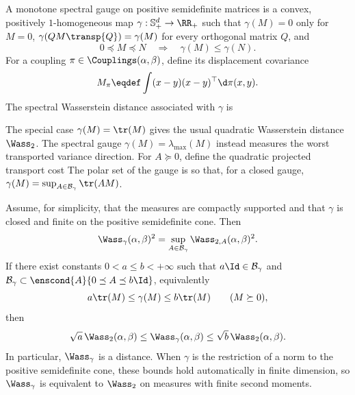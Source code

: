 \begin{defn}\label{def-spectral-wasserstein}
	A monotone spectral gauge on positive semidefinite matrices is a convex, positively $1$-homogeneous map $\gamma:\mathbb S_+^d\to\RR_+$ such that $\gamma(M)=0$ only for $M=0$, $\gamma(QM\transp{Q})=\gamma(M)$ for every orthogonal matrix $Q$, and
	\[
		0\preceq M\preceq N
		\quad\Longrightarrow\quad
		\gamma(M)\leq\gamma(N).
	\]
	For a coupling $\pi\in\Couplings(\alpha,\beta)$, define its displacement covariance
	\[
		M_\pi\eqdef\int (x-y)(x-y)^\top\d\pi(x,y).
	\]
	The spectral Wasserstein distance associated with $\gamma$ is
\end{defn}

The special case $\gamma(M)=\tr(M)$ gives the usual quadratic Wasserstein distance $\Wass_2$. The spectral gauge $\gamma(M)=\lambda_{\max}(M)$ instead measures the worst transported variance direction. For $A\succeq0$, define the quadratic projected transport cost
The polar set of the gauge is
so that, for a closed gauge, $\gamma(M)=\sup_{A\in\mathcal B_\gamma}\tr(AM)$.

\begin{prop}\label{prop-spectral-wasserstein-robust}
	Assume, for simplicity, that the measures are compactly supported and that $\gamma$ is closed and finite on the positive semidefinite cone. Then
	\[
		\Wass_\gamma(\alpha,\beta)^2
		=
		\sup_{A\in\mathcal B_\gamma}
		\Wass_{2,A}(\alpha,\beta)^2.
	\]
	If there exist constants $0<a\leq b<+\infty$ such that $a\Id\in\mathcal B_\gamma$ and $\mathcal B_\gamma\subset\enscond{A}{0\preceq A\preceq b\Id}$, equivalently
	\[
		a\tr(M)\leq\gamma(M)\leq b\tr(M)
		\qquad (M\succeq0),
	\]
	then
	\[
		\sqrt a\,\Wass_2(\alpha,\beta)
		\leq
		\Wass_\gamma(\alpha,\beta)
		\leq
		\sqrt b\,\Wass_2(\alpha,\beta).
	\]
	In particular, $\Wass_\gamma$ is a distance. When $\gamma$ is the restriction of a norm to the positive semidefinite cone, these bounds hold automatically in finite dimension, so $\Wass_\gamma$ is equivalent to $\Wass_2$ on measures with finite second moments.
\end{prop}

